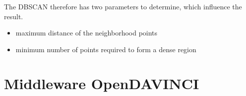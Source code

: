 The \ac {DBSCAN} therefore has two parameters to determine, which influence the result.
\begin{itemize}
 \item maximum distance of the neighborhood points
 \item minimum number of points required to form a dense region
\end{itemize}






\section{Middleware OpenDAVINCI}


